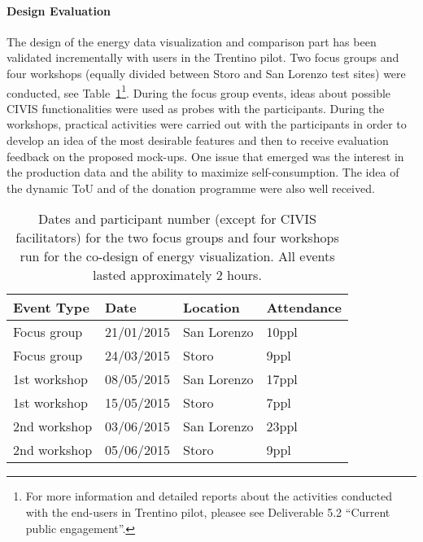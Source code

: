 \paragraph{Design Evaluation}
The design of the energy data visualization and comparison part has been validated incrementally with users in the Trentino pilot. Two focus groups and four workshops (equally divided between Storo and San Lorenzo test sites) were conducted, see Table~\ref{tab:workshopsTN}\footnote{For more information and detailed reports about the activities conducted with the end-users in Trentino pilot, pleasee see Deliverable 5.2 ``Current public engagement''.}. During the focus group events, ideas about possible CIVIS functionalities were used as probes with the participants. During the workshops, practical activities were carried out with the participants in order to develop an idea of the most desirable features and then to receive evaluation feedback on the proposed mock-ups.
% 
One issue that emerged was the interest in the production data and the ability to maximize self-consumption. The idea of the dynamic ToU and of the donation programme were also well received. 

\begin{table}[!htb]
\centering \small
\caption{Dates and participant number (except for CIVIS facilitators) for the two focus groups and four workshops run for the co-design of energy visualization. All events lasted approximately 2 hours.}
\label{tab:workshopsTN}
\begin{tabular}{|l|l|l|l|}
\hline
{\bf Event Type}   & {\bf Date} & {\bf Location} & {\bf Attendance} \\ \hline
Focus group & 21/01/2015 & San Lorenzo & 10ppl \\ \hline
Focus group & 24/03/2015 & Storo & 9ppl\\ \hline
1st workshop & 08/05/2015 & San Lorenzo & 17ppl \\ \hline
1st workshop &  15/05/2015 & Storo & 7ppl \\ \hline
2nd workshop & 03/06/2015 & San Lorenzo &  23ppl \\ \hline
2nd workshop & 05/06/2015 & Storo &  9ppl \\ \hline
\end{tabular}
\end{table}

